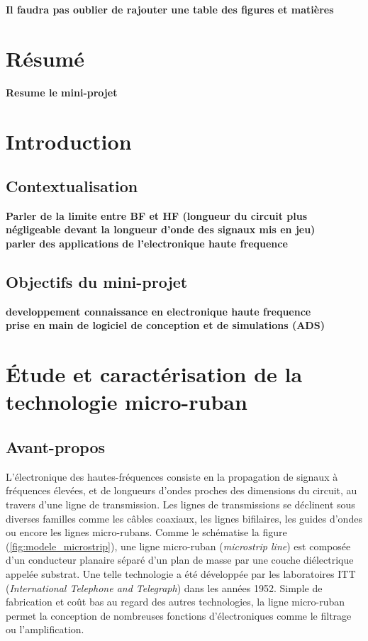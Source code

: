 \documentclass[french]{article}
\begin{document}
\newpage

\textbf{Il faudra pas oublier de rajouter une table des figures et matières}

\section{Résumé}
\textbf{Resume le mini-projet}

\section{Introduction}
\subsection{Contextualisation}
\textbf{Parler de la limite entre BF et HF (longueur du circuit plus négligeable devant la longueur d'onde des signaux mis en jeu)\\
parler des applications de l'electronique haute frequence}
\subsection{Objectifs du mini-projet}
\textbf{developpement connaissance en electronique haute frequence\\
prise en main de logiciel de conception et de simulations (ADS)}

\newpage

\section{Étude et caractérisation de la technologie micro-ruban}

\subsection{Avant-propos}

L'électronique des hautes-fréquences consiste en la propagation de signaux à fréquences élevées, et de longueurs d'ondes proches des dimensions du circuit, au travers d'une ligne de transmission. Les lignes de transmissions se déclinent sous diverses familles comme les câbles coaxiaux, les lignes bifilaires, les guides d'ondes ou encore les lignes micro-rubans. Comme le schématise la figure (\ref{fig:modele_microstrip}), une ligne micro-ruban (\textit{microstrip line}) est composée d'un conducteur planaire séparé d'un plan de masse par une couche diélectrique appelée substrat. Une telle technologie a été développée par les laboratoires ITT (\textit{International Telephone and Telegraph}) dans les années 1952. Simple de fabrication et coût bas au regard des autres technologies, la ligne micro-ruban permet la conception de nombreuses fonctions d'électroniques comme le filtrage ou l'amplification.
\end{document}
